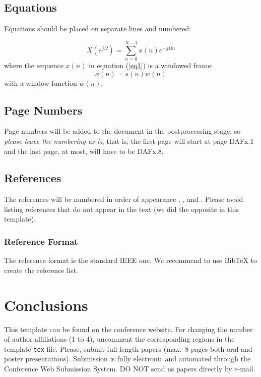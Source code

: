 \documentclass[twoside,a4paper]{article}
\begin{document}
\subsection{Equations}
Equations should be placed on separate lines and numbered:

\begin{equation}
  X(e^{j\Omega})=\sum_{n=0}^{N-1}x(n)e^{-j\Omega n}
  \label{eq1}
\end{equation}
where the sequence $x(n)$ in equation (\ref{eq1}) is a windowed frame:
\begin{equation}
  x(n)=s(n) w(n)
  \label{eq2}
\end{equation}
%
with a window function $w(n)$.


\subsection{Page Numbers}
Page numbers will be added to the document in the postprocessing stage, so {\em please leave the numbering as is},
that is, the first page will start at page DAFx.1 and the last page, at most, will have to be DAFx.8.


\subsection{References}
The references will be numbered in order of appearance \cite{Mitra:Kaiser:1993:DSP:handbook}, \cite{Haykin:1991:adaptive:filter}, \cite{Moorer:2000:AES:audio:millenium} and \cite{Nackaerts:2001:ICMC}. Please avoid listing references that do not appear in the text (we did the opposite in this template).


\subsubsection{Reference Format}
The reference format is the standard IEEE one. We recommend to use BibTeX to create the reference list.


\section{Conclusions}
This template can be found on the conference website.
For changing the number of author affiliations (1 to 4), uncomment the corresponding regions in the template \texttt{tex} file.
Please, submit full-length papers (max.~8 pages both oral and poster presentations).
Submission is fully electronic and automated through the Conference Web Submission System.
DO NOT send us papers directly by e-mail.
\end{document}

